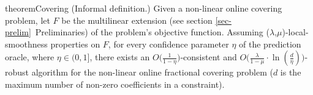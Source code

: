 \begin{restatable}{theorem}{Covering}
\label{thm:covering}
(Informal definition.) Given a non-linear online covering problem, let $F$ be the multilinear extension (see section \ref{sec-prelim}~Preliminaries) of the problem's objective function. Assuming ($\lambda$,$\mu$)-local-smoothness properties on $F$, for every confidence parameter $\eta$ of the prediction oracle, where $\eta \in (0,1]$, there exists an $O\bigl( \frac{1}{1 - \eta} \bigr)$-consistent and
$O\bigl( \frac{\lambda}{1 - \mu}  \cdot \ln \left(\frac{d}{\eta}\right) \bigr)$-robust algorithm for the non-linear online fractional covering problem ($d$ is the maximum number of non-zero coefficients in a constraint).
\end{restatable}

%



